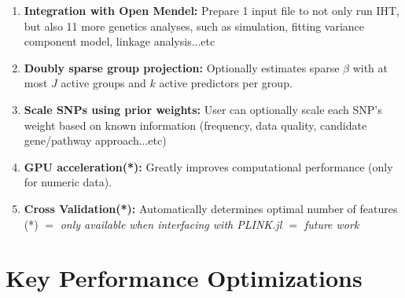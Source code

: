 \documentclass[a0,portrait]{a0poster}
\begin{document}
\begin{multicols}{2}
\color{Black} %
\begin{enumerate}
	\item \textbf{Integration with Open Mendel:} Prepare 1 input file to not only run IHT, but also 11 more genetics analyses, such as simulation, fitting variance component model, linkage analysis...etc
	\item \textbf{Doubly sparse group projection:} Optionally estimates sparse $\beta$ with at most $J$ active groups and $k$ active predictors per group. 
	\item \textbf{Scale SNPs using prior weights:} User can optionally scale each SNP's weight based on known information (frequency, data quality, candidate gene/pathway approach...etc)
	\item \textbf{GPU acceleration(*):} Greatly improves computational performance (only for numeric data).
	\item \textbf{Cross Validation(*):} Automatically determines optimal number of features\\
	\vspace{0.5cm}
	\centering (*) $=$ \textit{only available when interfacing with PLINK.jl $=$ future work}
\end{enumerate}



\color{Navy} %

\section*{Key Performance Optimizations}


\end{multicols}
\end{document}
